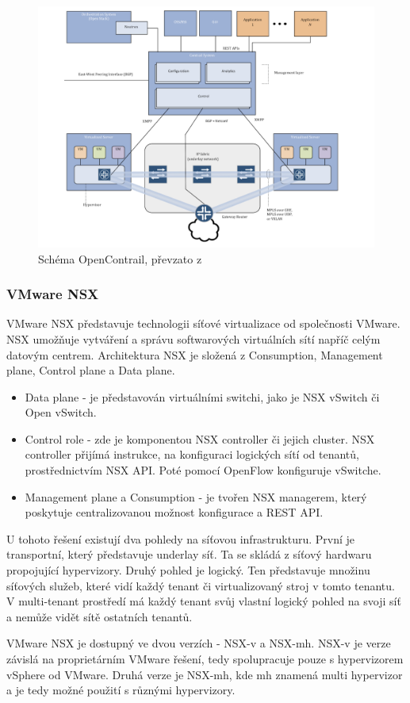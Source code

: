 \begin{figure}[h]
\begin{centering}
\includegraphics[scale=0.35]{images/contrail}
\par\end{centering}
\caption{Schéma OpenContrail, převzato z \cite{OpenContrail}\label{fig:contrail}}
\end{figure}

\subsubsection{VMware NSX}

VMware NSX představuje technologii síťové virtualizace od společnosti VMware. NSX umožňuje vytváření a správu softwarových virtuálních sítí napříč celým datovým centrem. Architektura NSX je složená z Consumption, Management plane, Control plane a Data plane. \cite{VMware_NSX}

\begin{itemize}
\item Data plane - je představován virtuálními switchi, jako je NSX vSwitch či Open vSwitch. 
\item Control role - zde je komponentou NSX controller či jejich cluster. NSX controller přijímá instrukce, na konfiguraci logických sítí od tenantů, prostřednictvím NSX API. Poté pomocí OpenFlow konfiguruje vSwitche.
\item Management plane a Consumption - je tvořen NSX managerem, který poskytuje centralizovanou možnost konfigurace a REST API. \cite{VMware_NSX}
\end{itemize}

U tohoto řešení existují dva pohledy na síťovou infrastrukturu. První je transportní, který představuje underlay síť. Ta se skládá z síťový hardwaru propojující hypervizory. Druhý pohled je logický. Ten představuje množinu síťových služeb, které vidí každý tenant či virtualizovaný stroj v tomto tenantu. V multi-tenant prostředí má každý tenant svůj vlastní logický pohled na svoji síť a nemůže vidět sítě ostatních tenantů. \cite{VMware_NSX}

VMware NSX je dostupný ve dvou verzích - NSX-v a NSX-mh. NSX-v je verze závislá na proprietárním VMware řešení, tedy spolupracuje pouze s hypervizorem vSphere od VMware. Druhá verze je NSX-mh, kde mh znamená multi hypervizor a je tedy možné použití s různými hypervizory. 